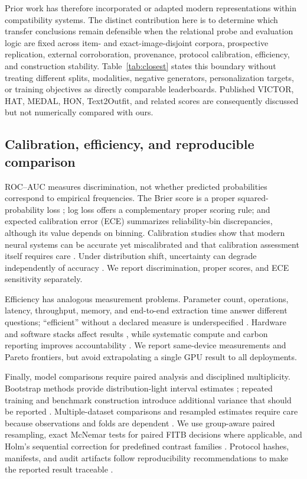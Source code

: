 \documentclass[preprint,12pt]{elsarticle}
\begin{document}
Prior work has therefore incorporated or adapted modern representations within compatibility systems. The distinct contribution here is to determine which transfer conclusions remain defensible when the relational probe and evaluation logic are fixed across item- and exact-image-disjoint corpora, prospective replication, external corroboration, provenance, protocol calibration, efficiency, and construction stability. Table~\ref{tab:closest} states this boundary without treating different splits, modalities, negative generators, personalization targets, or training objectives as directly comparable leaderboards. Published VICTOR, HAT, MEDAL, HON, Text2Outfit, and related scores are consequently discussed but not numerically compared with ours.

\subsection{Calibration, efficiency, and reproducible comparison}

ROC--AUC measures discrimination, not whether predicted probabilities correspond to empirical frequencies. The Brier score is a proper squared-probability loss \cite{brier1950}; log loss offers a complementary proper scoring rule; and expected calibration error (ECE) summarizes reliability-bin discrepancies, although its value depends on binning. Calibration studies show that modern neural systems can be accurate yet miscalibrated and that calibration assessment itself requires care \cite{niculescu2005probabilities,guo2017calibration,naeini2015calibration,vaicenavicius2019calibration,minderer2021revisiting}. Under distribution shift, uncertainty can degrade independently of accuracy \cite{ovadia2019uncertainty}. We report discrimination, proper scores, and ECE sensitivity separately.

Efficiency has analogous measurement problems. Parameter count, operations, latency, throughput, memory, and end-to-end extraction time answer different questions; ``efficient'' without a declared measure is underspecified \cite{dehghani2022efficiency}. Hardware and software stacks affect results \cite{hooker2021hardware}, while systematic compute and carbon reporting improves accountability \cite{schwartz2020green,henderson2020reporting,dodge2022carbon}. We report same-device measurements and Pareto frontiers, but avoid extrapolating a single GPU result to all deployments.

Finally, model comparisons require paired analysis and disciplined multiplicity. Bootstrap methods provide distribution-light interval estimates \cite{efron1994bootstrap}; repeated training and benchmark construction introduce additional variance that should be reported \cite{bouthillier2021variance}. Multiple-dataset comparisons and resampled estimates require care because observations and folds are dependent \cite{demsar2006statistical,nadeau2003inference}. We use group-aware paired resampling, exact McNemar tests for paired FITB decisions where applicable, and Holm's sequential correction for predefined contrast families \cite{holm1979}. Protocol hashes, manifests, and audit artifacts follow reproducibility recommendations to make the reported result traceable \cite{pineau2021reproducibility}.
\end{document}
